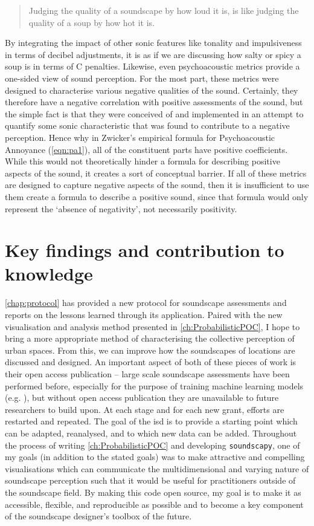 \begin{quote}
  Judging the quality of a soundscape by how loud it is, is like judging the quality of a soup by how hot it is. 
\end{quote}

By integrating the impact of other sonic features like tonality and impulsiveness in terms of decibel adjustments, it is as if we are discussing how salty or spicy a soup is in terms of \textdegree C penalties. Likewise, even psychoacoustic metrics provide a one-sided view of sound perception. For the most part, these metrics were designed to characterise various negative qualities of the sound. Certainly, they therefore have a negative correlation with positive assessments of the sound, but the simple fact is that they were conceived of and implemented in an attempt to quantify some sonic characteristic that was found to contribute to a negative perception. Hence why in Zwicker's empirical formula for Psychoacoustic Annoyance (\cref{eqn:pa1}), all of the constituent parts have positive coefficients. While this would not theoretically hinder a formula for describing positive aspects of the sound, it creates a sort of conceptual barrier. If all of these metrics are designed to capture negative aspects of the sound, then it is insufficient to use them create a formula to describe a positive sound, since that formula would only represent the `absence of negativity', not necessarily positivity.

\section{Key findings and contribution to knowledge}
\cref{chap:protocol} has provided a new protocol for soundscape assessments and reports on the lessons learned through its application. Paired with the new visualisation and analysis method presented in \cref{ch:ProbabilisticPOC}, I hope to bring a more appropriate method of characterising the collective perception of urban spaces. From this, we can improve how the soundscapes of locations are discussed and designed. An important aspect of both of these pieces of work is their open access publication -- large scale soundscape assessments have been performed before, especially for the purpose of training machine learning models (e.g. \citep{Yu2009Modeling}), but without open access publication they are unavailable to future researchers to build upon. At each stage and for each new grant, efforts are restarted and repeated. The goal of the \gls{isd} is to provide a starting point which can be adapted, reanalysed, and to which new data can be added. Throughout the process of writing \cref{ch:ProbabilisticPOC} and developing \texttt{soundscapy}, one of my goals (in addition to the stated goals) was to make attractive and compelling visualisations which can communicate the multidimensional and varying nature of soundscape perception such that it would be useful for practitioners outside of the soundscape field. By making this code open source, my goal is to make it as accessible, flexible, and reproducible as possible and to become a key component of the soundscape designer's toolbox of the future. 

